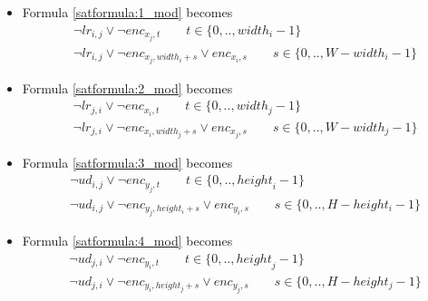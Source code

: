 \begin{itemize}
    \item Formula \ref{satformula:1_mod} becomes
        \begin{equation}
        \begin{aligned}\label{satformula:1final}
            &\neg lr_{i,j} \vee \neg {enc}_{x_{j},t} \qquad t \in \{ 0,.., {width}_i -1\} \\
            &\neg lr_{i,j} \vee \neg {enc}_{x_{j},{width}_i+s} \vee {enc}_{x_{i},s} \qquad s \in \{ 0,.., W-{width}_i-1\}
        \end{aligned}
        \end{equation}
    \item Formula \ref{satformula:2_mod} becomes
        \begin{equation}
        \begin{aligned}\label{satformula:2final}
            &\neg lr_{j,i} \vee \neg {enc}_{x_{i},t} \qquad t \in \{ 0,.., {width}_j -1\} \\
            &\neg lr_{j,i} \vee \neg {enc}_{x_{i},{width}_j+s} \vee {enc}_{x_{j},s} \qquad s \in \{ 0,.., W-{width}_j-1\}
        \end{aligned}
        \end{equation}

    \item Formula \ref{satformula:3_mod} becomes
        \begin{equation}
        \begin{aligned}\label{satformula:3final}
            & \neg ud_{i,j} \vee \neg{enc}_{y_{j},t} \qquad t \in \{ 0,.., {height}_i -1\} \\
            &\neg ud_{i,j} \vee \neg {enc}_{y_{j},height_{i}+s} \vee enc_{y_{i},s} \qquad s \in \{ 0,.., H-height_i-1\}
        \end{aligned}
        \end{equation}
        
    \item Formula \ref{satformula:4_mod} becomes
    \begin{equation}
    \begin{aligned}\label{satformula:4final}
        &\neg ud_{j,i} \vee \neg{enc}_{y_{i},t} \qquad t \in \{ 0,.., {height}_j -1\} \\
        &\neg ud_{j,i} \vee \neg {enc}_{y_{i},height_{j}+s} \vee enc_{y_{j},s} \qquad s \in \{ 0,.., H-height_j-1\}
    \end{aligned}
    \end{equation}
    
\end{itemize}


